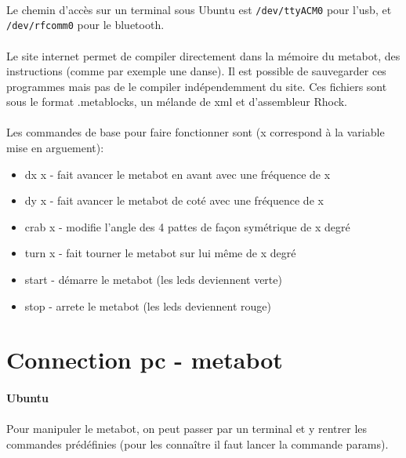 \documentclass[10pt,a4paper]{report}
\begin{document}
\paragraph{}
Le chemin d'accès sur un terminal sous Ubuntu est \texttt{/dev/ttyACM0} pour l'usb, et \texttt{/dev/rfcomm0} pour le bluetooth. 

\paragraph{}
Le site internet permet de compiler directement dans la mémoire du metabot, des instructions (comme par exemple une danse). Il est possible de sauvegarder ces programmes mais pas de le compiler indépendemment du site. Ces fichiers sont sous le format .metablocks, un mélande de xml et d'assembleur Rhock.
\paragraph{}
Les commandes de base pour faire fonctionner sont (x correspond à la variable mise en arguement):\\
\begin{itemize}
\item dx x - fait avancer le metabot en avant avec une fréquence de x
\item dy x - fait avancer le metabot de coté avec une fréquence de x
\item crab x - modifie l'angle des 4 pattes de façon symétrique de x degré
\item turn x - fait tourner le metabot sur lui même de x degré
\item start - démarre le metabot (les leds deviennent verte)
\item stop - arrete le metabot (les leds deviennent rouge)
\end{itemize}

\section{Connection pc - metabot}

\paragraph{Ubuntu}
\paragraph{}
Pour manipuler le metabot, on peut passer par un terminal et y rentrer les commandes prédéfinies (pour les connaître il faut lancer la commande params).
\end{document}
